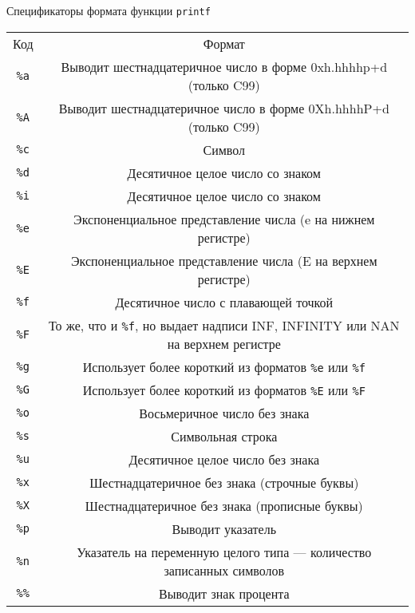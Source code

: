\documentclass {article}
\begin{document}
\begin{center}
Спецификаторы формата функции \texttt{printf}
\begin{tabular}{c c}
\rowcolor[rgb]{0.8,0.2,0.2} Код & Формат \\\tabrowsep
\rowcolor[rgb]{0.7,0.7,0.7} \texttt{\%a} & Выводит шестнадцатеричное число в форме 0xh.hhhhp+d (только C99)   \\\tabrowsep
\rowcolor[rgb]{0.7,0.7,0.7} \texttt{\%A} & Выводит шестнадцатеричное число в форме 0Xh.hhhhP+d (только C99)  \\\tabrowsep
\rowcolor[rgb]{0.7,0.7,0.7} \texttt{\%c} & Символ\\\tabrowsep
\rowcolor[rgb]{0.7,0.7,0.7} \texttt{\%d} & Десятичное целое число со знаком  \\\tabrowsep
\rowcolor[rgb]{0.7,0.7,0.7} \texttt{\%i} &  Десятичное целое число со знаком \\\tabrowsep
\rowcolor[rgb]{0.7,0.7,0.7} \texttt{\%e} &  Экспоненциальное представление числа (e на нижнем регистре)\\\tabrowsep
\rowcolor[rgb]{0.7,0.7,0.7} \texttt{\%E} &  Экспоненциальное представление числа (E на верхнем регистре)\\\tabrowsep
\rowcolor[rgb]{0.7,0.7,0.7} \texttt{\%f} & Десятичное число с плавающей точкой \\\tabrowsep
\rowcolor[rgb]{0.7,0.7,0.7} \texttt{\%F} &  То же, что и  \texttt{\%f}, но выдает надписи INF, INFINITY или NAN на верхнем регистре\\\tabrowsep
\rowcolor[rgb]{0.7,0.7,0.7} \texttt{\%g} & Использует более короткий из форматов  \texttt{\%e} или  \texttt{\%f} \\\tabrowsep
\rowcolor[rgb]{0.7,0.7,0.7} \texttt{\%G} & Использует более короткий из форматов  \texttt{\%E} или  \texttt{\%F} \\\tabrowsep
\rowcolor[rgb]{0.7,0.7,0.7} \texttt{\%o} &  Восьмеричное число без знака \\\tabrowsep
\rowcolor[rgb]{0.7,0.7,0.7} \texttt{\%s} & Символьная строка \\\tabrowsep
\rowcolor[rgb]{0.7,0.7,0.7} \texttt{\%u} &  Десятичное целое число без знака\\\tabrowsep
\rowcolor[rgb]{0.7,0.7,0.7} \texttt{\%x} &  Шестнадцатеричное без знака (строчные буквы)\\\tabrowsep
\rowcolor[rgb]{0.7,0.7,0.7} \texttt{\%X} &  Шестнадцатеричное без знака (прописные буквы)\\\tabrowsep
\rowcolor[rgb]{0.7,0.7,0.7} \texttt{\%p} &  Выводит указатель \\\tabrowsep
\rowcolor[rgb]{0.7,0.7,0.7} \texttt{\%n} &  Указатель на переменную целого типа --- количество записанных символов \\\tabrowsep
\rowcolor[rgb]{0.7,0.7,0.7} \texttt{\%\%} & Выводит знак процента \\
\end{tabular}
\end{center}
\end{document}
